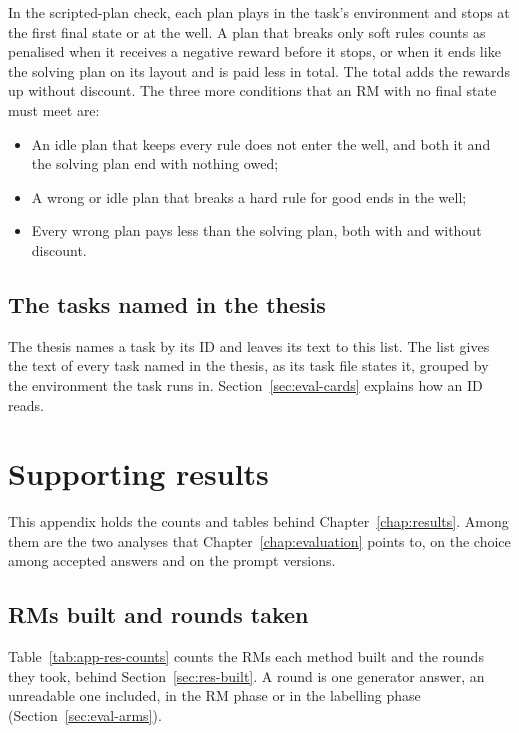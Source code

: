 \documentclass[11pt,english,listoffigures,listoftables]{tfgetsinf}
\begin{document}
In the scripted-plan check, each plan plays in the task's environment and stops at the first final state or at the well. A plan that breaks only soft rules counts as penalised when it receives a negative reward before it stops, or when it ends like the solving plan on its layout and is paid less in total. The total adds the rewards up without discount. The three more conditions that an RM with no final state must meet are:
\begin{itemize}
    \item An idle plan that keeps every rule does not enter the well, and both it and the solving plan end with nothing owed;
    \item A wrong or idle plan that breaks a hard rule for good ends in the well;
    \item Every wrong plan pays less than the solving plan, both with and without discount.
\end{itemize}

\section{The tasks named in the thesis}
\label{app:cards}

The thesis names a task by its ID and leaves its text to this list. The list gives the text of every task
named in the thesis, as its task file states it, grouped by the environment the task runs in.
Section~\ref{sec:eval-cards} explains how an ID reads.




\chapter{Supporting results}
\label{app:results}

This appendix holds the counts and tables behind Chapter~\ref{chap:results}. Among them are the two analyses that Chapter~\ref{chap:evaluation} points to, on the choice among accepted answers and on the prompt versions.

\section{RMs built and rounds taken}
\label{app:res-counts}

Table~\ref{tab:app-res-counts} counts the RMs each method built and the rounds they took, behind Section~\ref{sec:res-built}. A round is one generator answer, an unreadable one included, in the RM phase or in the labelling phase (Section~\ref{sec:eval-arms}).
\end{document}
